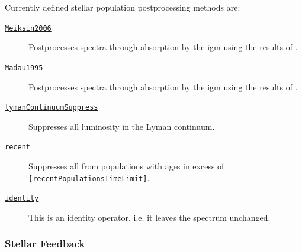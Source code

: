 Currently defined stellar population postprocessing methods are:
\begin{description}
\item [\hyperlink{stellar_populations.spectra.postprocess.Meiksin2006.F90:stellar_population_spectra_postprocessing_meiksin2006}{{\tt Meiksin2006}}] Postprocesses spectra through absorption by the \gls{igm} using the results of \cite{meiksin_colour_2006}.
\item [\hyperlink{stellar_populations.spectra.postprocess.Madau1995.F90:stellar_population_spectra_postprocessing_madau1995}{{\tt Madau1995}}] Postprocesses spectra through absorption by the \gls{igm} using the results of \cite{madau_radiative_1995}.
\item [\hyperlink{stellar_populations.spectra.postprocess.Lyman_continuum_suppress.F90:stellar_population_spectra_postprocessing_lyc_suppress}{{\tt lymanContinuumSuppress}}] Suppresses all luminosity in the Lyman continuum.
\item [\hyperlink{stellar_populations.spectra.postprocess.recent.F90:stellar_population_spectra_postprocessing_recent}{{\tt recent}}] Suppresses all from populations with ages in excess of {\tt [recentPopulationsTimeLimit]}.
\item [\hyperlink{stellar_populations.spectra.postprocess.identity.F90:stellar_population_spectra_postprocessing_identity}{{\tt identity}}] This is an identity operator, i.e. it leaves the spectrum unchanged.
\end{description}

\subsubsection{Stellar Feedback}

